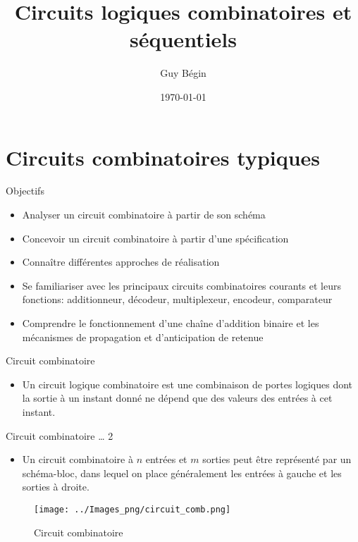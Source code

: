 \documentclass[presentation]{beamer}
\author{Guy Bégin}
\date{\today}
\title{Circuits logiques combinatoires et séquentiels}
\begin{document}
\maketitle

\section{Circuits combinatoires typiques}
\label{sec:org05b0c90}

\begin{frame}[label={sec:org328de4c}]{Objectifs}
\begin{itemize}
\item Analyser un circuit combinatoire à partir de son schéma
\item Concevoir un circuit combinatoire à partir d'une spécification
\item Connaître différentes approches de réalisation
\item Se familiariser avec les principaux circuits combinatoires courants et
leurs fonctions: additionneur, décodeur, multiplexeur, encodeur,
comparateur
\item Comprendre le fonctionnement d'une chaîne d'addition binaire et les
mécanismes de propagation et d'anticipation de retenue
\end{itemize}
\end{frame}

\begin{frame}[label={sec:orgb054a3a}]{Circuit combinatoire}
\begin{itemize}
\item Un circuit logique combinatoire est une combinaison de portes logiques dont la sortie à un instant donné ne dépend que des valeurs des entrées à cet instant.
\end{itemize}
\end{frame}

\begin{frame}[label={sec:org1677e66}]{Circuit combinatoire \ldots{} 2}
\begin{itemize}
\item Un circuit combinatoire à \(n\) entrées et \(m\) sorties peut être représenté par un schéma-bloc, dans lequel on place généralement les entrées à gauche et les sorties à droite.
\end{itemize}

\begin{figure}[htbp]
\centering
\texttt{[image: ../Images\_png/circuit\_comb.png]}
\caption{\label{fig:org920624b}Circuit combinatoire}
\end{figure}
\end{frame}
\end{document}
